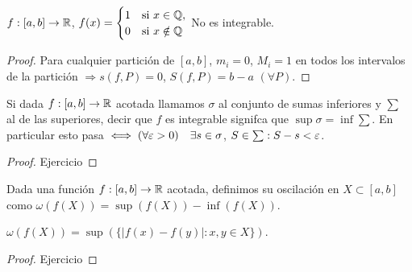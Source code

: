 \begin{eg}
  \(f: [a, b] \to \mathbb{R} \), \(f(x) = \begin{cases}
      1 & \text{si } x \in \mathbb{Q},   \\
      0 & \text{si } x \notin \mathbb{Q}
    \end{cases} \)
  No es integrable.
  \begin{proof}
    Para cualquier partición de \([a, b]\), \(m_i = 0\), \(M_i = 1\) en todos los intervalos de la partición \(\Rightarrow s(f, P) = 0\), \(S(f, P) = b-a\) \((\forall P)\).
  \end{proof}
\end{eg}

\begin{note}
  Si dada \(f: [a, b] \to \mathbb{R} \) acotada llamamos \(\sigma \) al conjunto de sumas inferiores y \(\sum \) al de las superiores, decir que \(f\) es integrable signifca que \( \sup \sigma = \inf \sum \).
  En particular esto pasa \(\iff (\forall \varepsilon > 0) \quad \exists s \in \sigma \), \(S \in \sum : S - s < \varepsilon \).
  \begin{proof}
    Ejercicio
  \end{proof}
\end{note}

\begin{definition}[Oscilación]
  Dada una función \(f: [a, b] \to \mathbb{R} \) acotada, definimos su oscilación en \(X \subset [a, b]\) como \(\omega(f(X)) = \sup(f(X)) - \inf(f(X))\).
\end{definition}

\begin{note}
  \(\omega(f(X)) = \sup(\{ |f(x) - f(y)| : x,y \in X \})\).
  \begin{proof}
    Ejercicio
  \end{proof}
\end{note}

